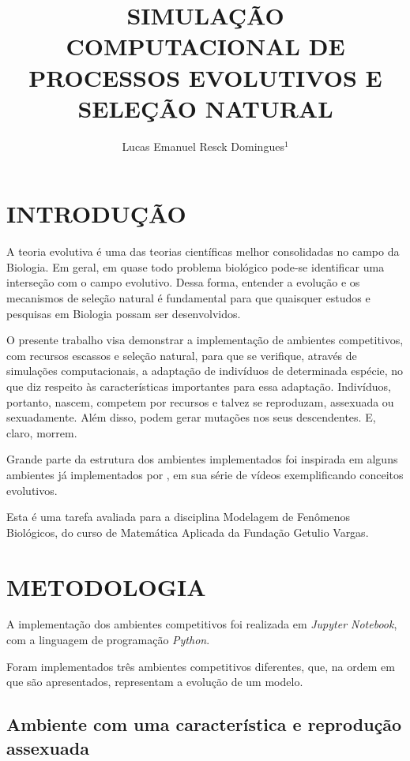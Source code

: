 \documentclass[10pt,brazil,english]{article}
\title{SIMULAÇÃO COMPUTACIONAL DE PROCESSOS EVOLUTIVOS E SELEÇÃO NATURAL}
\author{Lucas Emanuel Resck Domingues$^{1}$}
\begin{document}
    \pagestyle{fancy} %
    
    \maketitle
    \newpage
    
    \section{\uppercase{Introdução}}
    
    A teoria evolutiva é uma das teorias científicas melhor consolidadas no campo da Biologia. Em geral, em quase todo problema biológico pode-se identificar uma interseção com o campo evolutivo. Dessa forma, entender a evolução e os mecanismos de seleção natural é fundamental para que quaisquer estudos e pesquisas em Biologia possam ser desenvolvidos.
    
    O presente trabalho visa demonstrar a implementação de ambientes competitivos, com recursos escassos e seleção natural, para que se verifique, através de simulações computacionais, a adaptação de indivíduos de determinada espécie, no que diz respeito às características importantes para essa adaptação. Indivíduos, portanto, nascem, competem por recursos e talvez se reproduzam, assexuada ou sexuadamente. Além disso, podem gerar mutações nos seus descendentes. E, claro, morrem.
    
    Grande parte da estrutura dos ambientes implementados foi inspirada em alguns ambientes já implementados por , em sua série de vídeos exemplificando conceitos evolutivos.
    
    Esta é uma tarefa avaliada para a disciplina Modelagem de Fenômenos Biológicos, do curso de Matemática Aplicada da Fundação Getulio Vargas.
    
    \section{\uppercase{Metodologia}}
    
    A implementação dos ambientes competitivos foi realizada em \textit{Jupyter Notebook}, com a linguagem de programação \textit{Python}.
    
    Foram implementados três ambientes competitivos diferentes, que, na ordem em que são apresentados, representam a evolução de um modelo.
    
        \subsection{Ambiente com uma característica e reprodução assexuada}
        
\end{document}
